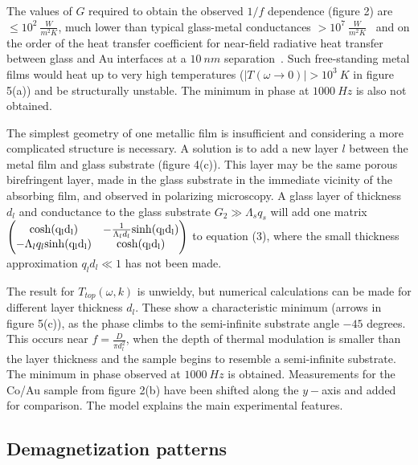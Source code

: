 \documentclass[5p]{elsarticle}
\begin{document}
The values of $G$ required to obtain the observed $1/f$ dependence (figure 2) are $\leq 10^{2}~\frac{W}{m^{2}K}$, much lower than typical glass-metal conductances $>10^{7} ~\frac{W}{m^{2}K}$~\cite{2009Juve} and on the order of the heat transfer coefficient for near-field radiative heat transfer between glass and Au interfaces at a $10~nm$ separation~\cite{2009Shen}. Such free-standing metal films would heat up to very high temperatures ($|T(\omega \rightarrow 0)|>10^{3}~K$ in figure 5(a)) and be structurally unstable. The minimum in phase at $1000~Hz$ is also not obtained.

The simplest geometry of one metallic film is insufficient and considering a more complicated structure is necessary. A solution is to add a new layer $l$ between the metal film and glass substrate (figure 4(c)). This layer may be the same porous birefringent layer, made in the glass substrate in the immediate vicinity of the absorbing film, and observed in polarizing microscopy. A glass layer of thickness $d_{l}$ and conductance to the glass substrate $G_{2} \gg \Lambda_{s}q_{s}$ will add one matrix $\rm \Biggl(\begin{matrix} \rm{cosh}(q_{l}d_{l}) & -\frac{1}{\Lambda_{l}d_{l}} \rm{sinh}(q_{l}d_{l}) \\ -\Lambda_{l} q_{l} \rm{sinh}(q_{l}d_{l}) & \rm{cosh}(q_{l}d_{l}) \end{matrix} \Biggr)$ to equation (3), where the small thickness approximation $q_{l}d_{l} \ll 1$ has not been made.

The result for $T_{top}(\omega,k)$ is unwieldy, but numerical calculations can be made for different layer thickness $d_{l}$. These show a characteristic minimum (arrows in figure 5(c)), as the phase climbs to the semi-infinite substrate angle $-45$ degrees. This occurs near $f=\frac{D}{\pi d_{l}^{2}}$, when the depth of thermal modulation is smaller than the layer thickness and the sample begins to resemble a semi-infinite substrate. The minimum in phase observed at $1000~Hz$ is obtained. Measurements for the Co/Au sample from figure 2(b) have been shifted along the $y-$axis and added for comparison. The model explains the main experimental features.

\subsection{Demagnetization patterns}
\end{document}
